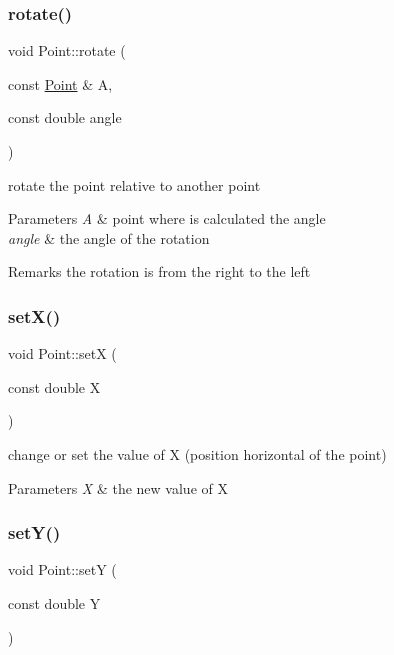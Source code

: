 \subsubsection{\texorpdfstring{rotate()}{rotate()}}
{\footnotesize\ttfamily void Point\+::rotate (\begin{DoxyParamCaption}\item[{const \hyperlink{class_point}{Point} \&}]{A,  }\item[{const double}]{angle }\end{DoxyParamCaption})}



rotate the point relative to another point 


\begin{DoxyParams}{Parameters}
{\em A} & point where is calculated the angle \\
\hline
{\em angle} & the angle of the rotation \\
\hline
\end{DoxyParams}
\begin{DoxyRemark}{Remarks}
the rotation is from the right to the left 
\end{DoxyRemark}
\hypertarget{class_point_a59ad664629f66d7faa5a97c222b11e53}{}\label{class_point_a59ad664629f66d7faa5a97c222b11e53} 
\subsubsection{\texorpdfstring{set\+X()}{setX()}}
{\footnotesize\ttfamily void Point\+::setX (\begin{DoxyParamCaption}\item[{const double}]{X }\end{DoxyParamCaption})}



change or set the value of X (position horizontal of the point) 


\begin{DoxyParams}{Parameters}
{\em X} & the new value of X \\
\hline
\end{DoxyParams}
\hypertarget{class_point_a62d94bacca48640df1beb272527e0c75}{}\label{class_point_a62d94bacca48640df1beb272527e0c75} 
\subsubsection{\texorpdfstring{set\+Y()}{setY()}}
{\footnotesize\ttfamily void Point\+::setY (\begin{DoxyParamCaption}\item[{const double}]{Y }\end{DoxyParamCaption})}



